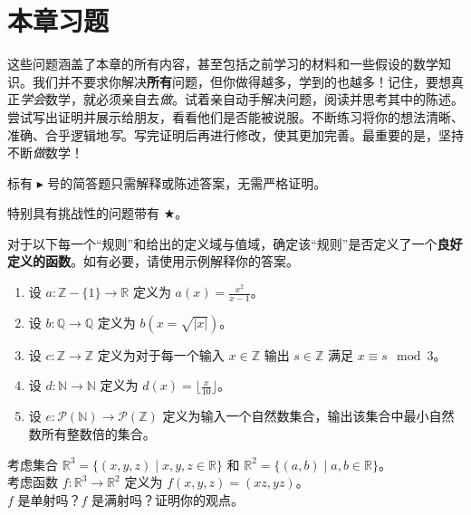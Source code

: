 \section{本章习题}

这些问题涵盖了本章的所有内容，甚至包括之前学习的材料和一些假设的数学知识。我们并不要求你解决\textbf{所有}问题，但你做得越多，学到的也越多！记住，要想真正\emph{学会}数学，就必须亲自去\emph{做}。试着亲自动手解决问题，阅读并思考其中的陈述。尝试写出证明并展示给朋友，看看他们是否能被说服。不断练习将你的想法清晰、准确、合乎逻辑地\emph{写}。写完证明后再进行修改，使其更加完善。最重要的是，坚持不断\emph{做}数学！

标有 $\blacktriangleright$ 号的简答题只需解释或陈述答案，无需严格证明。

特别具有挑战性的问题带有 $\bigstar$。\\

\begin{exercise}
    对于以下每一个``规则''和给出的定义域与值域，确定该``规则''是否定义了一个\textbf{良好定义的函数}。如有必要，请使用示例解释你的答案。
    \begin{enumerate}[label=(\alph*)]
        \item 设 $a : \mathbb{Z} - \{1\} \to \mathbb{R}$ 定义为 $a(x) = \frac{x^2}{x-1}$。
        \item 设 $b : \mathbb{Q} \to \mathbb{Q}$ 定义为 $b(x = \sqrt{|x|})$。
        \item 设 $c : \mathbb{Z} \to \mathbb{Z}$ 定义为对于每一个输入 $x \in \mathbb{Z}$ 输出 $s \in \mathbb{Z}$ 满足 $x \equiv s \mod 3$。
        \item 设 $d : \mathbb{N} \to \mathbb{N}$ 定义为 $d(x) = \lfloor\frac{x}{10}\rfloor$。
        \item 设 $e : \mathcal{P}(\mathbb{N}) \to \mathcal{P}(\mathbb{Z})$ 定义为输入一个自然数集合，输出该集合中最小自然数所有整数倍的集合。
    \end{enumerate}
\end{exercise}

\begin{exercise}
    考虑集合 $\mathbb{R}^3 = \{(x, y, z) \mid x, y, z \in \mathbb{R}\}$ 和 $\mathbb{R}^2 = \{(a, b) \mid a, b \in \mathbb{R}\}$。\\
    考虑函数 $f : \mathbb{R}^3 \to \mathbb{R}^2$ 定义为 $f(x, y, z) = (xz, yz)$。\\
    $f$ 是单射吗？$f$ 是满射吗？证明你的观点。
\end{exercise}

